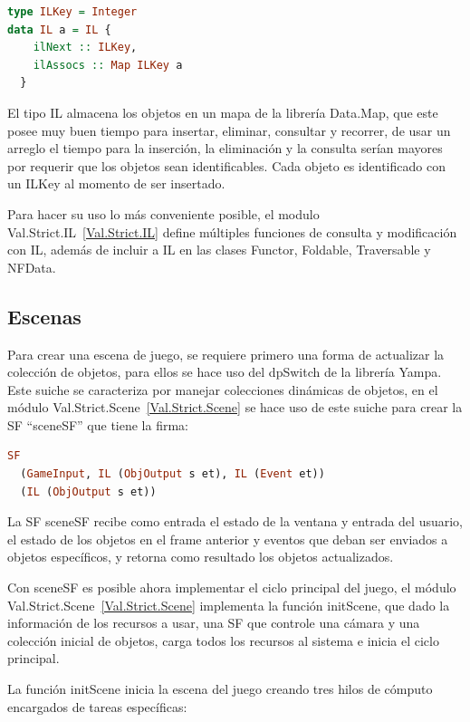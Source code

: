 \begin{lstlisting}[frame=single,language=Haskell]
type ILKey = Integer
data IL a = IL {
    ilNext :: ILKey,
    ilAssocs :: Map ILKey a
  }
\end{lstlisting}

El tipo IL almacena los objetos en un mapa de la librería Data.Map, que este posee muy buen tiempo para insertar, eliminar, consultar y recorrer, de usar un arreglo el tiempo para la inserción, la eliminación y la consulta serían mayores por requerir que los objetos sean identificables. Cada objeto es identificado con un ILKey al momento de ser insertado.

Para hacer su uso lo más conveniente posible, el modulo Val.Strict.IL~\ref{Val.Strict.IL} define múltiples funciones de consulta y modificación con IL, además de incluir a IL en las clases Functor, Foldable, Traversable y NFData.

\subsection{Escenas}
\label{sec:Escenas}

Para crear una escena de juego, se requiere primero una forma de actualizar la colección de objetos, para ellos se hace uso del dpSwitch de la librería Yampa. Este suiche se caracteriza por manejar colecciones dinámicas de objetos, en el módulo Val.Strict.Scene~\ref{Val.Strict.Scene} se hace uso de este suiche para crear la SF “sceneSF” que tiene la firma:

\begin{lstlisting}[frame=single,language=Haskell]
SF
  (GameInput, IL (ObjOutput s et), IL (Event et))
  (IL (ObjOutput s et))
\end{lstlisting}

La SF sceneSF recibe como entrada el estado de la ventana y entrada del usuario, el estado de los objetos en el frame anterior y eventos que deban ser enviados a objetos específicos, y retorna como resultado los objetos actualizados.

Con sceneSF es posible ahora implementar el ciclo principal del juego, el módulo Val.Strict.Scene~\ref{Val.Strict.Scene} implementa la función initScene, que dado la información de los recursos a usar, una SF que controle una cámara y una colección inicial de objetos, carga todos los recursos al sistema e inicia el ciclo principal.

La función initScene inicia la escena del juego creando tres hilos de cómputo encargados de tareas específicas:


